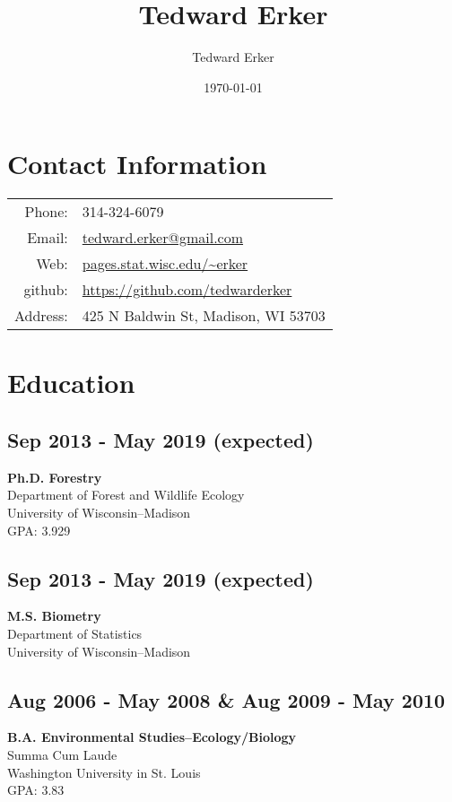 \documentclass{article}
\author{Tedward Erker}
\date{\today}
\title{Tedward Erker}
\begin{document}
\maketitle
\section*{Contact Information}
\label{sec:orga15c8a3}
\begin{center}
\begin{tabular}{rp{}}
Phone: & 314-324-6079\\
Email: & \href{mailto:erker@wisc.edu}{tedward.erker@gmail.com}\\
Web: & \href{http://pages.stat.wisc.edu/\~erker/}{pages.stat.wisc.edu/\textasciitilde{}erker}\\
github: & \url{https://github.com/tedwarderker}\\
Address: & 425 N Baldwin St, Madison, WI 53703\\
\end{tabular}
\end{center}

\section*{Education}
\label{sec:org696b49d}
\subsection*{Sep 2013 - May 2019 (expected)}
\label{sec:org8d58d17}
\textbf{Ph.D. Forestry} \\
Department of Forest and Wildlife Ecology \\
University of Wisconsin--Madison \\
GPA: 3.929

\subsection*{Sep 2013 - May 2019 (expected)}
\label{sec:orgdd74295}
\textbf{M.S. Biometry} \\
Department of Statistics \\
University of Wisconsin--Madison

\subsection*{Aug 2006 - May 2008 \& Aug 2009 - May 2010}
\label{sec:orgb7b06ef}
\textbf{B.A. Environmental Studies--Ecology/Biology} \\
Summa Cum Laude \\
Washington University in St. Louis \\
GPA: 3.83
\end{document}
